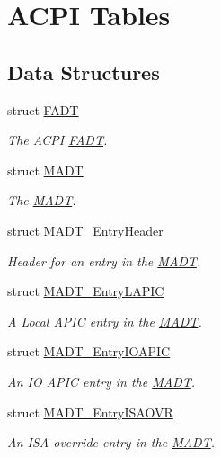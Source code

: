 \hypertarget{group__acpi__tables}{}\section{A\+C\+PI Tables}
\label{group__acpi__tables}
\subsection*{Data Structures}
\begin{DoxyCompactItemize}
\item 
struct \hyperlink{structFADT}{F\+A\+DT}
\begin{DoxyCompactList}\small\item\em The A\+C\+PI \hyperlink{structFADT}{F\+A\+DT}. \end{DoxyCompactList}\item 
struct \hyperlink{structMADT}{M\+A\+DT}
\begin{DoxyCompactList}\small\item\em The \hyperlink{structMADT}{M\+A\+DT}. \end{DoxyCompactList}\item 
struct \hyperlink{structMADT__EntryHeader}{M\+A\+D\+T\+\_\+\+Entry\+Header}
\begin{DoxyCompactList}\small\item\em Header for an entry in the \hyperlink{structMADT}{M\+A\+DT}. \end{DoxyCompactList}\item 
struct \hyperlink{structMADT__EntryLAPIC}{M\+A\+D\+T\+\_\+\+Entry\+L\+A\+P\+IC}
\begin{DoxyCompactList}\small\item\em A Local A\+P\+IC entry in the \hyperlink{structMADT}{M\+A\+DT}. \end{DoxyCompactList}\item 
struct \hyperlink{structMADT__EntryIOAPIC}{M\+A\+D\+T\+\_\+\+Entry\+I\+O\+A\+P\+IC}
\begin{DoxyCompactList}\small\item\em An IO A\+P\+IC entry in the \hyperlink{structMADT}{M\+A\+DT}. \end{DoxyCompactList}\item 
struct \hyperlink{structMADT__EntryISAOVR}{M\+A\+D\+T\+\_\+\+Entry\+I\+S\+A\+O\+VR}
\begin{DoxyCompactList}\small\item\em An I\+SA override entry in the \hyperlink{structMADT}{M\+A\+DT}. \end{DoxyCompactList}\item 

\end{DoxyCompactItemize}
